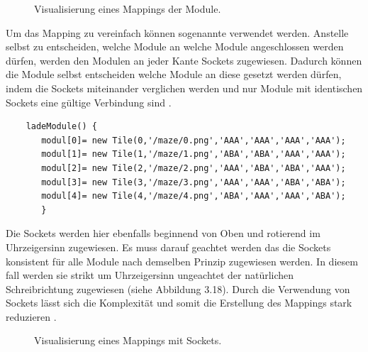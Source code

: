 \documentclass[12pt, a4paper,twoside,openany]{report} %
\begin{document}
\begin{figure}[H]
    \centering
    \caption{Visualisierung eines Mappings der Module.}%
\end{figure}

Um das Mapping zu vereinfach können sogenannte  verwendet werden.
Anstelle selbst zu entscheiden, welche Module an welche Module angeschlossen werden dürfen,
werden den Modulen an jeder Kante Sockets zugewiesen.
Dadurch können die Module selbst entscheiden welche Module an diese gesetzt werden dürfen,
indem die Sockets miteinander verglichen werden und nur Module mit identischen Sockets eine gültige Verbindung sind \cite{Shiffman}.

\begin{lstlisting}
    ladeModule() {
       modul[0]= new Tile(0,'/maze/0.png','AAA','AAA','AAA','AAA');
       modul[1]= new Tile(1,'/maze/1.png','ABA','ABA','AAA','AAA');
       modul[2]= new Tile(2,'/maze/2.png','AAA','ABA','ABA','AAA');
       modul[3]= new Tile(3,'/maze/3.png','AAA','AAA','ABA','ABA');
       modul[4]= new Tile(4,'/maze/4.png','ABA','AAA','AAA','ABA');
       }
\end{lstlisting}

Die Sockets werden hier ebenfalls beginnend von Oben und rotierend im Uhrzeigersinn zugewiesen.
Es muss darauf geachtet werden das die Sockets konsistent für alle Module nach demselben Prinzip zugewiesen werden.
In diesem fall werden sie strikt um Uhrzeigersinn ungeachtet der natürlichen Schreibrichtung zugewiesen {(siehe Abbildung 3.18)}.
Durch die Verwendung von Sockets lässt sich die Komplexität und somit die Erstellung des Mappings stark reduzieren \cite{Shiffman}.

\begin{figure}[H]
    \centering
    \caption{Visualisierung eines Mappings mit Sockets.}%
\end{figure}
\end{document}
